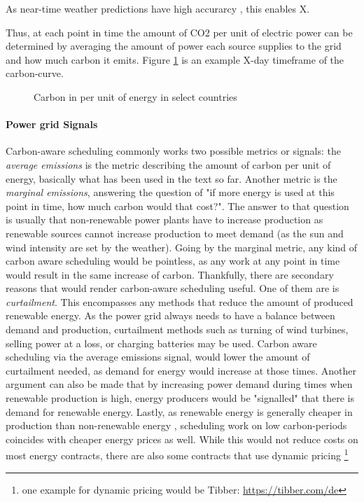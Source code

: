 As near-time weather predictions have high accurarcy , this enables X.

Thus, at each point in time the amount of CO2 per unit of electric power can be determined by averaging the amount of power each source supplies to the grid and how much carbon it emits. Figure \ref{fig:carbon_curve} is an example X-day timeframe of the carbon-curve.

\begin{figure}
    \caption[short]{Carbon in per unit of energy in select countries}
    \label{fig:carbon_curve}
\end{figure}

\paragraph{Power grid Signals}
Carbon-aware scheduling commonly works two possible metrics or signals: the \emph{average emissions} is the metric describing the amount of carbon per unit of energy, basically what has been used in the text so far. Another metric is the \emph{marginal emissions}, answering the question of "if more energy is used at this point in time, how much carbon would that cost?". 
The answer to that question is usually that non-renewable power plants have to increase production as renewable sources cannot increase production to meet demand (as the sun and wind intensity are set by the weather). 
Going by the marginal metric, any kind of carbon aware scheduling would be pointless, as any work at any point in time would result in the same increase of carbon. 
Thankfully, there are secondary reasons that would render carbon-aware scheduling useful. One of them are is \emph{curtailment}. 
This encompasses any methods that reduce the amount of produced renewable energy. As the power grid always needs to have a balance between demand and production, curtailment methods such as turning of wind turbines, selling power at a loss, or charging batteries may be used. 
Carbon aware scheduling via the average emissions signal, would lower the amount of curtailment needed, as demand for energy would increase at those times.
Another argument can also be made that by increasing power demand during times when renewable production is high, energy producers would be "signalled" that there is demand for renewable energy.
Lastly, as renewable energy is generally cheaper in production than non-renewable energy , scheduling work on low carbon-periods coincides with cheaper energy prices as well. While this would not reduce costs on most energy contracts, there are also some contracts that use dynamic pricing \footnote{one example for dynamic pricing would be Tibber: \url{https://tibber.com/de}}


